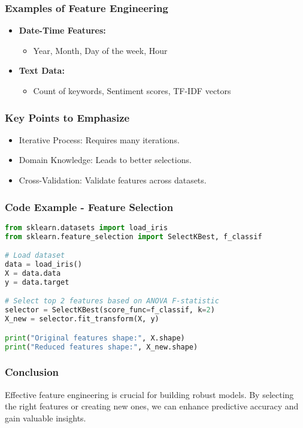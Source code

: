 \documentclass[aspectratio=169]{beamer}
\begin{document}
\begin{frame}[fragile]
    \frametitle{Examples of Feature Engineering}
    \begin{itemize}
        \item \textbf{Date-Time Features:}
            \begin{itemize}
                \item Year, Month, Day of the week, Hour
            \end{itemize}
        \item \textbf{Text Data:}
            \begin{itemize}
                \item Count of keywords, Sentiment scores, TF-IDF vectors
            \end{itemize}
    \end{itemize}
\end{frame}

\begin{frame}[fragile]
    \frametitle{Key Points to Emphasize}
    \begin{itemize}
        \item Iterative Process: Requires many iterations.
        \item Domain Knowledge: Leads to better selections.
        \item Cross-Validation: Validate features across datasets.
    \end{itemize}
\end{frame}

\begin{frame}[fragile]
    \frametitle{Code Example - Feature Selection}
    \begin{lstlisting}[language=Python, basicstyle=\small]
from sklearn.datasets import load_iris
from sklearn.feature_selection import SelectKBest, f_classif

# Load dataset
data = load_iris()
X = data.data
y = data.target

# Select top 2 features based on ANOVA F-statistic
selector = SelectKBest(score_func=f_classif, k=2)
X_new = selector.fit_transform(X, y)

print("Original features shape:", X.shape)
print("Reduced features shape:", X_new.shape)
    \end{lstlisting}
\end{frame}

\begin{frame}[fragile]
    \frametitle{Conclusion}
    Effective feature engineering is crucial for building robust models. By selecting the right features or creating new ones, we can enhance predictive accuracy and gain valuable insights.
\end{frame}
\end{document}
